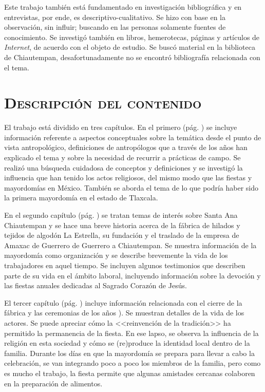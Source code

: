 \documentclass[14pt,letterpaper,twoside]{extbook} %
\begin{document}
Este trabajo también está fundamentado en investigación bibliográfica y en entrevistas, por ende, es descriptivo-cualitativo. Se hizo con base en la observación, sin influir; buscando en las personas solamente fuentes de conocimiento. Se investigó también en libros, hemerotecas, páginas y artículos de \textit{Internet}, de acuerdo con el objeto de estudio. Se buscó material en la biblioteca de Chiautempan, desafortunadamente no se encontró bibliografía relacionada con el tema.

\section*{\mdseries\large\textsc{Descripción del contenido}}

\noindent El trabajo está dividido en tres capítulos. En el primero (pág. \oldstylenums{\pageref{Capitulo_1}}) se incluye información referente a aspectos conceptuales sobre la temática desde el punto de vista antropológico, definiciones de antropólogos que a través de los años han explicado el tema y sobre la necesidad de recurrir a prácticas de campo. Se realizó una búsqueda cuidadosa de conceptos y definiciones y se investigó la influencia que han tenido los actos religiosos, del mismo modo que las fiestas y mayordomías en México. También se aborda el tema de lo que podría haber sido la primera mayordomía en el estado de Tlaxcala.

En el segundo capítulo (pág. \oldstylenums{\pageref{Capitulo_2}}) se tratan temas de interés sobre Santa Ana Chiautempan y se hace una breve historia acerca de la fábrica de hilados y tejidos de algodón La Estrella, su fundación y el traslado de la empresa de Amaxac de Guerrero de Guerrero a Chiautempan. Se muestra información de la mayordomía como organización y se describe brevemente la vida de los trabajadores en aquel tiempo. Se incluyen algunos testimonios que describen parte de su vida en el ámbito laboral, incluyendo información sobre la devoción y las fiestas anuales dedicadas al Sagrado Corazón de Jesús.

El tercer capítulo (pág. \oldstylenums{\pageref{Capitulo_3}}) incluye información relacionada con el cierre de la fábrica y las ceremonias de los años ). Se muestran detalles de la vida de los actores. Se puede apreciar cómo la <<reinvención de la tradición>> ha permitido la permanencia de la fiesta. En ese lapso, se observa la influencia de la religión en esta sociedad y cómo se (re)produce la identidad local dentro de la familia. Durante los días en que la mayordomía se prepara para llevar a cabo la celebración, se van integrando poco a poco los miembros de la familia, pero como es mucho el trabajo, la fiesta permite que algunas amistades cercanas colaboren en la preparación de alimentos.
\end{document}
